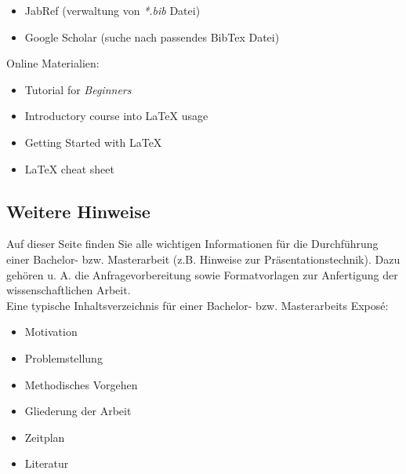 \documentclass[11pt]{scrartcl}
\newcommand{\href}[2]{#2}
\begin{document}
\begin{itemize}
	\item \href{http://www.jabref.org/}{JabRef} (verwaltung von \textit{*.bib} Datei)
	\item \href{https://scholar.google.de/}{Google Scholar} (suche nach passendes BibTex Datei)
\end{itemize}		

Online Materialien:

\begin{itemize}
	\item \href{http://www.latex-tutorial.com/tutorials/beginners/}{Tutorial for \textit{Beginners}}
	\item \href{https://github.com/vdmitriyev/latex-intro}{Introductory course into LaTeX usage}
	\item \href{http://www.math.uiuc.edu/~hildebr/tex/latex-start.html}{Getting Started with LaTeX}
	\item \href{http://wch.github.io/latexsheet/}{LaTeX cheat sheet}
\end{itemize}				

\subsection{Weitere Hinweise}
Auf dieser \href{https://www.uni-oldenburg.de/informatik/vlba/lehre/hinweise-und-vorlagen/}{Seite} finden Sie alle wichtigen Informationen für die Durchführung einer Bachelor- bzw. Masterarbeit (z.B. \href{https://www.uni-oldenburg.de/fileadmin/user_upload/informatik/ag/vlba/download/Praesentationstechnik.pdf}{Hinweise zur Präsentationstechnik}). Dazu gehören u. A. die Anfragevorbereitung sowie Formatvorlagen zur Anfertigung der wissenschaftlichen Arbeit.\\


Eine typische Inhaltsverzeichnis für einer Bachelor- bzw. Masterarbeits Exposé:

\begin{itemize}
	\item Motivation
	\item Problemstellung
	\item Methodisches Vorgehen
	\item Gliederung der Arbeit
	\item Zeitplan
	\item Literatur
\end{itemize}
\end{document}
